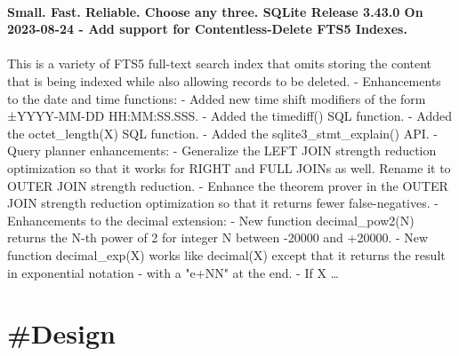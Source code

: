 \documentclass[10pt,a4paper]{article}
\begin{document}
\begin{multicols}{2}
\paragraph{}
\textbf{Small. Fast. Reliable.
Choose any three.
SQLite Release 3.43.0 On 2023-08-24
- Add support for Contentless-Delete FTS5 Indexes.}
\paragraph{}
 This is a variety
of FTS5 full-text search index that omits storing the content that is being indexed
while also allowing records to be deleted.
- Enhancements to the date and time functions:
- Added new time shift modifiers of the form ±YYYY-MM-DD HH:MM:SS.SSS.
- Added the timediff() SQL function.
- Added the octet\_length(X) SQL function.
- Added the sqlite3\_stmt\_explain() API.
- Query planner enhancements:
- Generalize the LEFT JOIN strength reduction optimization so that it works
for RIGHT and FULL JOINs as well. Rename it to
OUTER JOIN strength reduction.
- Enhance the theorem prover in the OUTER JOIN strength reduction optimization
so that it returns fewer false-negatives.
- Enhancements to the decimal extension:
- New function decimal\_pow2(N) returns the N-th power of 2 for integer N
between -20000 and +20000.
- New function decimal\_exp(X) works like decimal(X) except that it returns
the result in exponential notation - with a "e+NN" at the end.
- If X
\dots\par
\end{multicols}

\newpage
\section{\#Design}
\end{document}
